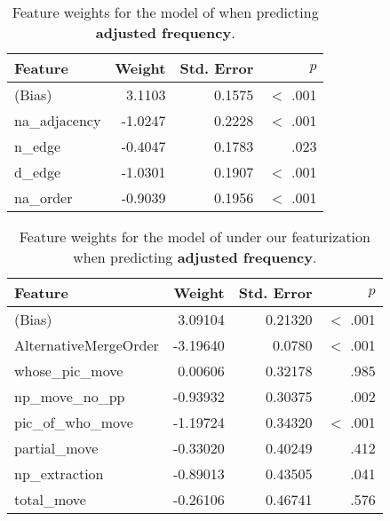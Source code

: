 \documentclass[11pt]{article}
\newcommand{\lt}{<}
\begin{document}
\begin{table}[ht!]
  \centering
  \begin{tabular}{|l|r|r|r|}
    \hline
    Feature & Weight & Std. Error & $p$ \\
    \hline
    (Bias)      &  3.1103 &     0.1575 &  $\lt$ .001 \\
    na\_adjacency &  -1.0247 &     0.2228 & $\lt$ .001 \\
    n\_edge      &  -0.4047 &     0.1783 &   .023 \\
    d\_edge      &  -1.0301 &     0.1907 & $\lt$ .001 \\
    na\_order    &  -0.9039 &     0.1956 & $\lt$ .001 \\
    \hline
  \end{tabular}
  \caption{Feature weights for the model of \citet{cysouw2010dealing} when predicting \textbf{adjusted frequency}.}
\end{table}

\begin{table}[ht!]
  \centering
  \begin{tabular}{|l|r|r|r|}
    \hline
    Feature & Weight & Std. Error & $p$ \\
    \hline
    (Bias)              &  3.09104 &    0.21320 &  $\lt$ .001 \\
    AlternativeMergeOrder & -3.19640  &  0.0780 & $\lt$ .001 \\
    whose\_pic\_move       &  0.00606 &    0.32178 & .985 \\
    np\_move\_no\_pp       &  -0.93932 &    0.30375 & .002 \\
    pic\_of\_who\_move     &  -1.19724 &    0.34320 & $\lt$ .001 \\
    partial\_move        &  -0.33020 &    0.40249 & .412 \\
    np\_extraction       &  -0.89013 &    0.43505 & .041 \\
    total\_move          &  -0.26106 &    0.46741 & .576 \\
    \hline
  \end{tabular}
  \caption{Feature weights for the model of \citet{cinque2005deriving} under our featurization when predicting \textbf{adjusted frequency}.}
\end{table}
\end{document}
